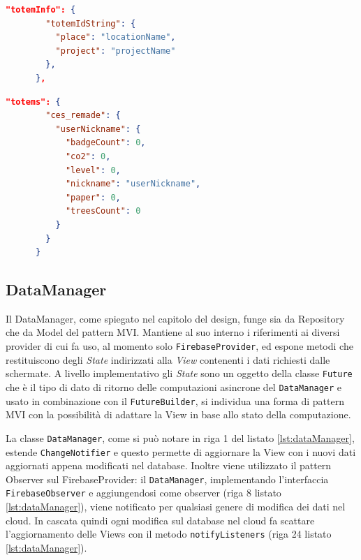 \begin{lstlisting}[language=json, caption={Esempio di oggetto JSON contenente le informazioni sui totem}, label={lst:totemInfo}]
    "totemInfo": {
        "totemIdString": {
          "place": "locationName",
          "project": "projectName"
        },
      },
\end{lstlisting}  

\begin{lstlisting}[language=json, caption={Esempio di oggetto JSON che memorizza i dati utente per ciascun Totem}, label={lst:userDataTotem}]
      "totems": {
        "ces_remade": {
          "userNickname": {
            "badgeCount": 0,
            "co2": 0,
            "level": 0,
            "nickname": "userNickname",
            "paper": 0,
            "treesCount": 0
          }
        }
      }
\end{lstlisting}

\subsection{DataManager}
Il DataManager, come spiegato nel capitolo del design, funge sia da Repository che da Model del pattern MVI. Mantiene al suo interno i riferimenti ai diversi provider di cui fa uso, al momento solo \texttt{FirebaseProvider}, ed espone metodi che restituiscono degli \textit{State} indirizzati alla \textit{View} contenenti i dati richiesti dalle schermate. A livello implementativo gli \textit{State} sono un oggetto della classe \texttt{Future} che è il tipo di dato di ritorno delle computazioni asincrone del \texttt{DataManager} e usato in combinazione con il \texttt{FutureBuilder}, si individua una forma di pattern MVI con la possibilità di adattare la View in base allo stato della computazione.

La classe \texttt{DataManager}, come si può notare in riga 1 del listato \ref{lst:dataManager}, estende \texttt{ChangeNotifier} e questo permette di aggiornare la View con i nuovi dati aggiornati appena modificati nel database.
Inoltre viene utilizzato il pattern Observer sul FirebaseProvider: il \texttt{DataManager}, implementando l'interfaccia \texttt{FirebaseObserver} e aggiungendosi come observer (riga 8 listato \ref{lst:dataManager}), viene notificato per qualsiasi genere di modifica dei dati nel cloud.
In cascata quindi ogni modifica sul database nel cloud fa scattare l'aggiornamento delle Views con il metodo \texttt{notifyListeners} (riga 24 listato \ref{lst:dataManager}).

